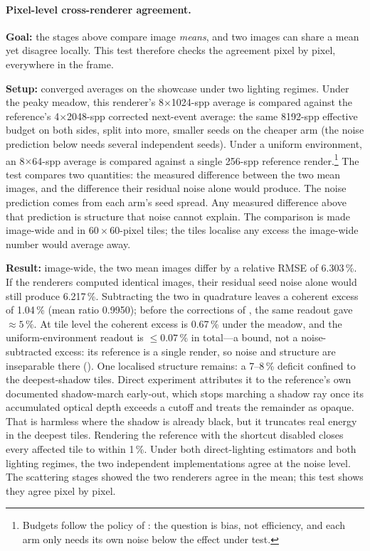 \paragraph{Pixel-level cross-renderer agreement.} \textbf{Goal:} the stages above compare image
\emph{means}, and two images can share a mean yet disagree locally. This test therefore checks
the agreement pixel by pixel, everywhere in the frame.

\textbf{Setup:} converged averages on
the showcase under two lighting regimes. Under the peaky meadow, this renderer's
\num{8}$\times$\num{1024}-spp average is compared against the reference's \num{4}$\times$\num{2048}-spp corrected next-event
average: the same \num{8192}-spp effective budget on both sides, split into more, smaller
seeds on the cheaper arm (the noise prediction below needs several independent seeds). Under a uniform environment, an
\num{8}$\times$\num{64}-spp average is compared against a single \num{256}-spp reference
render.\footnote{Budgets follow the policy of : the question is bias, not
efficiency, and each arm only needs its own noise below the effect under test.} The test compares two quantities: the measured difference between the two mean images, and
the difference their residual noise alone would produce. The noise prediction comes from each arm's seed spread. Any measured difference above
that prediction is structure that noise cannot explain. The comparison is made image-wide and
in $60\times60$-pixel tiles; the tiles localise any excess the image-wide number would average
away.

\textbf{Result:} image-wide, the two mean images differ by a relative RMSE of
\num{6.303}\,\%. If the renderers computed identical images, their residual seed noise
alone would still produce \num{6.217}\,\%. Subtracting the two in
quadrature leaves a coherent excess of \num{1.04}\,\% (mean ratio \num{0.9950}); before the
corrections of , the same readout gave ${\approx}5\,\%$. At tile
level the coherent excess is \num{0.67}\,\% under the meadow, and the uniform-environment
readout is ${\le}\num{0.07}\,\%$ in total---a bound, not a noise-subtracted excess: its
reference is a single render, so noise and structure are inseparable there
(). One localised structure remains: a
\numrange{7}{8}\,\% deficit confined to the deepest-shadow tiles. Direct experiment attributes
it to the reference's own documented shadow-march early-out, which stops marching a shadow ray
once its accumulated optical depth exceeds a cutoff and treats the remainder as opaque. That
is harmless where the shadow is already black, but it truncates real energy in the deepest
tiles. Rendering the reference with the shortcut disabled closes every affected tile to within
\num{1}\,\%. Under both direct-lighting estimators and both lighting regimes, the two
independent implementations agree at the noise level. The scattering stages showed the two
renderers agree in the mean; this test shows they agree pixel by pixel.

